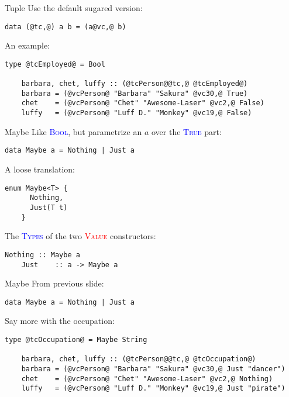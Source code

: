 \documentclass[xcolor={usenames,dvipsnames}]{beamer}
\newcommand{\htycon}[1]{\textcolor{Blue}{\textsc{#1}}}
\newcommand{\hvalcon}[1]{\textcolor{Red}{\textsc{#1}}}
\begin{document}
\begin{frame}[fragile]{Tuple}
  Use the default sugared version:
  \begin{lstlisting}[style=hask]
    data (@tc,@) a b = (a@vc,@ b)
  \end{lstlisting}

  \pause
  An example:
  \begin{lstlisting}[style=hask]
    type @tcEmployed@ = Bool

    barbara, chet, luffy :: (@tcPerson@@tc,@ @tcEmployed@)
    barbara = (@vcPerson@ "Barbara" "Sakura" @vc30,@ True)
    chet    = (@vcPerson@ "Chet" "Awesome-Laser" @vc2,@ False)
    luffy   = (@vcPerson@ "Luff D." "Monkey" @vc19,@ False)
  \end{lstlisting}
\end{frame}

\begin{frame}[fragile]{Maybe}
  Like \htycon{Bool}, but parametrize an $a$ over the \htycon{True} part:
  \begin{lstlisting}[style=hask]
    data Maybe a = Nothing | Just a
  \end{lstlisting}

  \pause
  A loose translation:
  \begin{lstlisting}[style=hask]
    enum Maybe<T> {
      Nothing,
      Just(T t)
    }
  \end{lstlisting}

  \pause
  The \htycon{Types} of the two \hvalcon{Value} constructors:
  \begin{lstlisting}[style=hask]
    Nothing :: Maybe a
    Just    :: a -> Maybe a
  \end{lstlisting}
\end{frame}

\begin{frame}[fragile]{Maybe}
  From previous slide:
  \begin{lstlisting}[style=hask]
    data Maybe a = Nothing | Just a
  \end{lstlisting}

  \pause
  Say more with the occupation:
  \begin{lstlisting}[style=hask]
    type @tcOccupation@ = Maybe String

    barbara, chet, luffy :: (@tcPerson@@tc,@ @tcOccupation@)
    barbara = (@vcPerson@ "Barbara" "Sakura" @vc30,@ Just "dancer")
    chet    = (@vcPerson@ "Chet" "Awesome-Laser" @vc2,@ Nothing)
    luffy   = (@vcPerson@ "Luff D." "Monkey" @vc19,@ Just "pirate")
  \end{lstlisting}
\end{frame}
\end{document}

